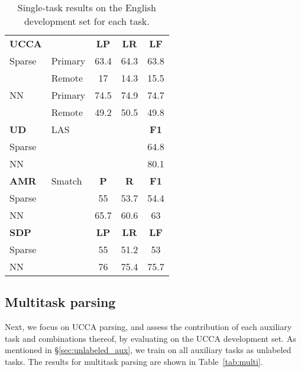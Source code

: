 \documentclass[11pt,a4paper]{article}
\begin{document}
\begin{table}
\begin{tabular}{llccc}
\textbf{UCCA} & & \textbf{LP} & \textbf{LR} & \textbf{LF} \\
Sparse & \small Primary & 63.4 & 64.3 & 63.8 \\
       & \small Remote & 17 & 14.3 & 15.5 \\
NN & \small Primary & 74.5 & 74.9 & 74.7 \\
       & \small Remote & 49.2 & 50.5 & 49.8 \\
\hline
\textbf{UD} & \small LAS & & & \textbf{F1} \\
Sparse & & & & 64.8 \\
NN & & & & 80.1 \\
\hline
\textbf{AMR} & \small Smatch & \textbf{P} & \textbf{R} & \textbf{F1} \\
Sparse & & 55 & 53.7 & 54.4 \\
NN & & 65.7 & 60.6 & 63 \\
\hline
\textbf{SDP} & & \textbf{LP} & \textbf{LR} & \textbf{LF} \\
Sparse & & 55 & 51.2 & 53 \\
NN & & 76 & 75.4 & 75.7
\end{tabular}
\caption{Single-task results on the English development set for each task.\label{tab:single}}
\end{table}


\subsection{Multitask parsing}\label{sec:results_multi}

Next, we focus on UCCA parsing, and assess the contribution of each auxiliary task
and combinations thereof, by evaluating on the UCCA development set.
As mentioned in \S\ref{sec:unlabeled_aux}, we train on all auxiliary tasks as unlabeled tasks.
The results for multitask parsing are shown in Table~\ref{tab:multi}.
\end{document}
